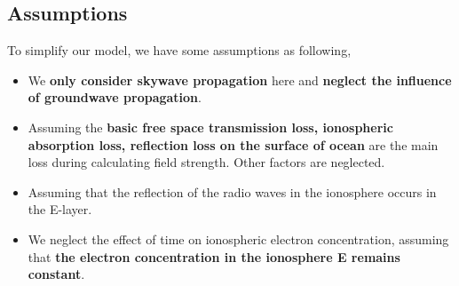 \documentclass{mcmthesis}
\begin{document}
\subsection{Assumptions}
To simplify our model, we have some assumptions as following, 
\begin{itemize}
\item We \textbf{only consider skywave propagation} here and \textbf{neglect the influence of groundwave propagation}.
\item Assuming the \textbf{basic free space transmission loss, ionospheric absorption loss, reflection loss on the surface of ocean} are the main loss during calculating field strength. Other factors are neglected.
\item Assuming that the reflection of the radio waves in the ionosphere occurs in the E-layer.
\item We neglect the effect of time on ionospheric electron concentration, assuming that \textbf{the electron concentration in the ionosphere E remains constant}.
\end{itemize}
\end{document}
